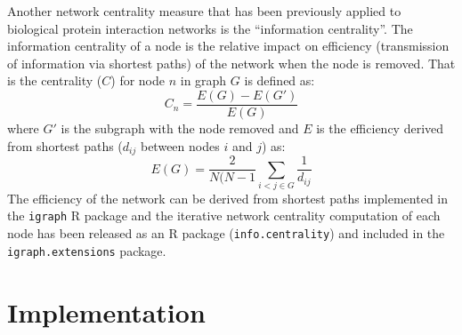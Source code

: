 Another network centrality measure that has been previously applied to biological protein interaction networks \citep{Kranthi2013} is the ``information centrality''. The information centrality of a node is the relative impact on efficiency (transmission of information via shortest paths) of the network when the node is removed. That is the centrality ($C$) \citep{Kranthi2013} for node $n$ in graph $G$ is defined as: $$C_n = \frac{E(G)-E(G')}{E(G)}$$ where $G'$ is the subgraph with the node removed and $E$ is the efficiency \citep{Latora2001} derived from shortest paths ($d_{ij}$ between nodes $i$ and $j$) as: $$E(G) = \frac{2}{N(N-1} \sum_{i<j \in G}^{} \frac{1}{d_{ij}}$$ The efficiency of the network can be derived from shortest paths implemented in the \texttt{igraph} R package and the iterative network centrality computation of each node has been released as an R package (\texttt{info.centrality}) and included in the \texttt{igraph.extensions} package.

\section{Implementation}



